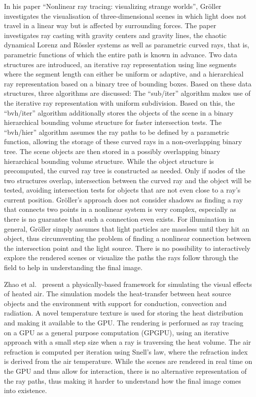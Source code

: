 In his paper \enquote{Nonlinear ray tracing: visualizing strange worlds}, Gröller~\cite{grollerNonlinearRayTracing1995} investigates the visualisation of three-dimensional scenes in which light does not travel in a linear way but is affected by surrounding forces.
The paper investigates ray casting with gravity centers and gravity lines, the chaotic dynamical Lorenz and Rössler systems as well as parametric curved rays, that is, parametric functions of which the entire path is known in advance.
Two data structures are introduced, an iterative ray representation using line segments where the segment length can either be uniform or adaptive, and a hierarchical ray representation based on a binary tree of bounding boxes.
Based on these data structures, three algorithms are discussed:
The \enquote{sub/iter} algorithm makes use of the iterative ray representation with uniform subdivision.
Based on this, the \enquote{bvh/iter} algorithm additionally stores the objects of the scene in a binary hierarchical bounding volume structure for faster intersection tests.
The \enquote{bvh/hier} algorithm assumes the ray paths to be defined by a parametric function, allowing the storage of these curved rays in a non-overlapping binary tree.
The scene objects are then stored in a possibly overlapping binary hierarchical bounding volume structure.
While the object structure is precomputed, the curved ray tree is constructed as needed.
Only if nodes of the two structures overlap, intersection between the curved ray and the object will be tested, avoiding intersection tests for objects that are not even close to a ray's current position.
Gröller's approach does not consider shadows as finding a ray that connects two points in a nonlinear system is very complex, especially as there is no guarantee that such a connection even exists.
For illumination in general, Gröller simply assumes that light particles are massless until they hit an object, thus circumventing the problem of finding a nonlinear connection between the intersection point and the light source.
There is no possibility to interactively explore the rendered scenes or visualize the paths the rays follow through the field to help in understanding the final image.

Zhao et al.~\cite{zhaoVisualSimulationHeat2007} present a physically-based framework for simulating the visual effects of heated air.
The simulation models the heat-transfer between heat source objects and the environment with support for conduction, convection and radiation.
A novel temperature texture is used for storing the heat distribution and making it available to the GPU.
The rendering is performed as ray tracing on a GPU as a general purpose computation (GPGPU), using an iterative approach with a small step size when a ray is traversing the heat volume.
The air refraction is computed per iteration using Snell's law, where the refraction index is derived from the air temperature.
While the scenes are rendered in real time on the GPU and thus allow for interaction, there is no alternative representation of the ray paths, thus making it harder to understand how the final image comes into existence.

